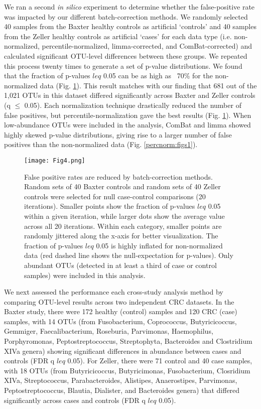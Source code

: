 We ran a second \textit{in silico} experiment to determine whether the false-positive rate was impacted by our different batch-correction methods.
We randomly selected 40 samples from the Baxter healthy controls as artificial `controls' and 40 samples from the Zeller healthy controls as artificial `cases' for each data type (i.e. non-normalized, percentile-normalized, limma-corrected, and ComBat-corrected) and calculated significant OTU-level differences between these groups.
We repeated this process twenty times to generate a set of p-value distributions.
We found that the fraction of p-values $leq$ 0.05 can be as high as ~70\% for the non-normalized data (Fig. \ref{percnorm:fig4}).
This result matches with our finding that 681 out of the 1,021 OTUs in this dataset differed significantly across Baxter and Zeller controls (q $\leq$ 0.05).
Each normalization technique drastically reduced the number of false positives, but percentile-normalization gave the best results (Fig. \ref{percnorm:fig4}).
When low-abundance OTUs were included in the analysis, ComBat and limma showed highly skewed p-value distributions, giving rise to a larger number of false positives than the non-normalized data (Fig. \ref{percnorm:figs1}).

\begin{figure}[h]
\begin{center}
    \texttt{[image: Fig4.png]}
    \caption{False positive rates are reduced by batch-correction methods. Random sets of 40 Baxter controls and random sets of 40 Zeller controls were selected for null case-control comparisons (20 iterations). Smaller points show the fraction of p-values $leq$ 0.05 within a given iteration, while larger dots show the average value across all 20 iterations. Within each category, smaller points are randomly jittered along the x-axis for better visualization. The fraction of p-values $leq$ 0.05 is highly inflated for non-normalized data (red dashed line shows the null-expectation for p-values). Only abundant OTUs (detected in at least a third of case or control samples) were included in this analysis.}\label{percnorm:fig4}
\end{center}
\end{figure}

We next assessed the performance each cross-study analysis method by comparing OTU-level results across two independent CRC datasets.
In the Baxter study, there were 172 healthy (control) samples and 120 CRC (case) samples, with 14 OTUs (from Fusobacterium, Coprococcus, Butyricicoccus, Gemmiger, Faecalibacterium, Roseburia, Parvimonas, Haemophilus, Porphyromonas, Peptostreptococcus, Streptophyta, Bacteroides and Clostridium XIVa genera) showing significant differences in abundance between cases and controls (FDR q $leq$ 0.05).
For Zeller, there were 71 control and 40 case samples, with 18 OTUs (from Butyricicoccus, Butyricimonas, Fusobacterium, Closridium XIVa, Streptococcus, Parabacteroides, Alistipes, Anaerostipes, Parvimonas, Peptostreptococcus, Blautia, Dialister, and Bacteroides genera) that differed significantly across cases and controls (FDR q $leq$ 0.05).

